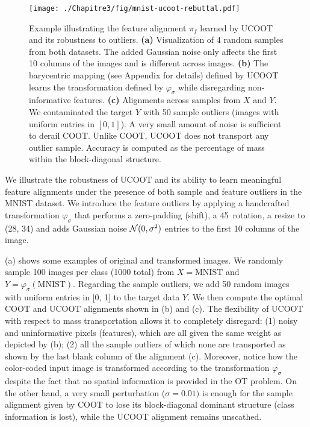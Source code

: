 \begin{figure}[t]
  \centering
  \texttt{[image: ./Chapitre3/fig/mnist-ucoot-rebuttal.pdf]}
  \caption{Example illustrating the feature alignment $\pi_f$ learned by UCOOT
  and its robustness to outliers.
  \textbf{(a)} Visualization of 4 random samples from both datasets.
  The added Gaussian noise only affects the first 10 columns of the images
  and is different across images.
  \textbf{(b)} The barycentric mapping (see Appendix for details)
  defined by UCOOT learns the transformation defined by $\varphi_\sigma$
  while disregarding non-informative features.
  \textbf{(c)} Alignments across samples from $X$ and $Y$.
  We contaminated the target $Y$ with 50 sample outliers
  (images with uniform entries in $[0,1]$).
  A very small amount of noise is sufficient to derail COOT.
  Unlike COOT, UCOOT does not transport any outlier sample.
  Accuracy is computed as the percentage of mass within the block-diagonal structure.
  \label{f:mnist-example}}
\end{figure}
We illustrate the robustness of UCOOT and its ability to learn meaningful feature alignments
under the presence of both sample and feature outliers in the MNIST dataset.
We introduce the feature outliers by applying a handcrafted transformation $\varphi_\sigma$
that performs a zero-padding (shift), a 45\textdegree\ rotation,
a resize to (28, 34) and adds Gaussian noise $\mathcal N(0, \sigma^2)$ entries
to the first 10 columns of the image.

 (a) shows some examples of original and transformed images.
We randomly sample 100 images per class (1000 total) from $X = \text{MNIST}$ and
$Y = \varphi_{\sigma}(\text{MNIST})$. Regarding the sample outliers,
we add 50 random images with uniform entries in [0, 1] to the target data $Y$.
We then compute the optimal COOT and UCOOT alignments shown in
 (b) and (c).
The flexibility of UCOOT with respect to mass transportation allows it to completely disregard:
(1) noisy and uninformative pixels (features),
which are all given the same weight as depicted by (b);
(2) all the sample outliers of which none are transported as shown
by the last blank column of the alignment (c).
Moreover, notice how the color-coded input image is transformed according to
the transformation $\varphi_{\sigma}$ despite the fact that
no spatial information is provided in the OT problem. On the other hand,
a very small perturbation ($\sigma = 0.01)$ is enough for the sample alignment
given by COOT to lose its block-diagonal dominant structure (class information is lost),
while the UCOOT alignment remains unscathed.

